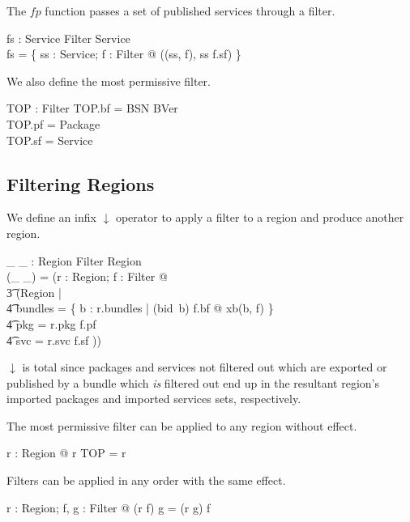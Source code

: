 \documentclass[a4paper,9pt]{article}
\begin{document}
The $fp$ function passes a set of published services through a filter.
\begin{axdef}
  fs : \power Service \cross Filter \fun \power Service \\
\where
  fs = \{ ss : \power Service; f : Filter @ ((ss, f), ss \cap f.sf) \}
\end{axdef}

We also define the most permissive filter.
\begin{axdef}
  TOP : Filter
\where
  TOP.bf = BSN \cross BVer \\
  TOP.pf = Package \\
  TOP.sf = Service \\
\end{axdef}

\subsection{Filtering Regions}

We define an infix $\downarrow$ operator to apply a filter to a region and produce another region.
\begin{axdef}
  \_ \downarrow \_ : Region \cross Filter \fun Region \\
\where
  (\_ \downarrow \_) = (\lambda r : Region;  f : Filter @ \\
\t3   (\mu Region | \\
\t4 bundles = \{ b : r.bundles | (bid~b) \in f.bf @ xb(b, f) \} \land \\
\t4 pkg = r.pkg \cap f.pf \land \\
\t4 svc = r.svc \cap f.sf )) \\
\end{axdef}
$\downarrow$ is total since packages and services not filtered out which are exported or published by a
bundle which \textit{is} filtered out end up
in the resultant region's imported packages and imported services sets, respectively.

The most permissive filter can be applied to any region without effect.
\begin{argue}
  \shows \forall r : Region @ r \downarrow TOP = r \\
\end{argue}

Filters can be applied in any order with the same effect.
\begin{argue}
  \shows \forall r : Region; f, g : Filter @ (r \downarrow f) \downarrow g = (r \downarrow g) \downarrow f \\
\end{argue}
\end{document}
